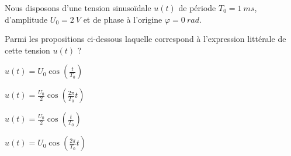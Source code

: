 \begin{enonce}
	 Nous disposons d'une tension sinusoïdale $u(t)$ de période $T_0=\SI{1}{ms}$, d'amplitude $U_0=\SI{2}{V}$ et de phase à l'origine $\varphi=\SI{0}{rad}$. 
	
	Parmi les propositions ci-dessous laquelle correspond à l'expression littérale de cette tension $u(t)$ ?
	
	\smallskip

	\begin{listeQCM2Colonnes}
		\item $u(t) = U_0 \cos \left(\frac{t}{T_0} \right)$
		\item $u(t) = \frac{U_0}{2} \cos \left(\frac{2\pi}{T_0} t \right)$
		\item $u(t) = \frac{U_0}{2} \cos \left(\frac{t}{T_0} \right)$
		\item $u(t) = U_0 \cos \left(\frac{2\pi}{T_0} t\right)$
	\end{listeQCM2Colonnes}
	\bigskip
	\medskip
\end{enonce}

\reponse{ \reponseD{}}




 \finEntrainement





\newpage




\hauteurLargeurCadreReponse		{8mm}{10cm}
\typeEntrainement				{} %
\initialisationEntrainement

